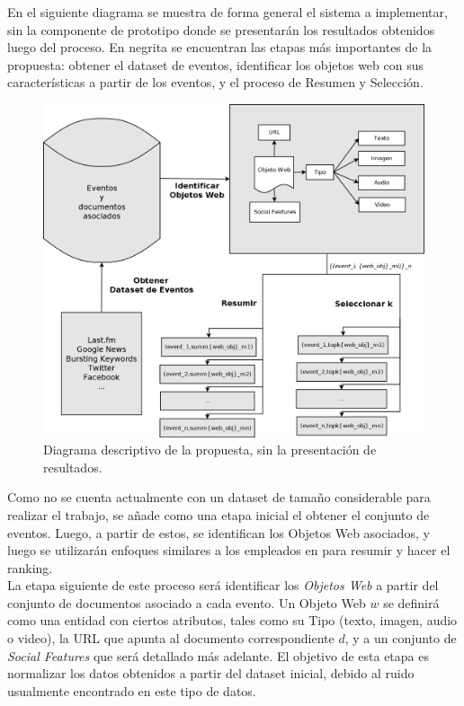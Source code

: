 \documentclass[11pt]{article}
\begin{document}
   En el siguiente diagrama se muestra de forma general el sistema a implementar, sin la componente de prototipo donde se presentarán los resultados obtenidos luego del proceso. En negrita se encuentran las etapas más importantes de la propuesta: obtener el dataset de eventos, identificar los objetos web con sus características a partir de los eventos, y el proceso de Resumen y Selección.\\

   \begin{figure}[htb]
\centering
\includegraphics[width=15cm]{./img/fw.png}
\caption{Diagrama descriptivo de la propuesta, sin la presentación de resultados.}
\end{figure}

   Como no se cuenta actualmente con un dataset de tamaño considerable para realizar el trabajo, se añade como una etapa inicial el obtener el conjunto de eventos. Luego, a partir de estos, se identifican los Objetos Web asociados, y luego se utilizarán enfoques similares a los empleados en \cite{events,clusterers} para resumir y hacer el ranking.\\

   La etapa siguiente de este proceso será identificar los \emph{Objetos Web} a partir del conjunto de documentos asociado a cada evento. Un Objeto Web $w$ se definirá como una entidad con ciertos atributos, tales como su Tipo (texto, imagen, audio o video), la URL que apunta al documento correspondiente $d$, y a un conjunto de \emph{Social Features} que será detallado más adelante. El objetivo de esta etapa es normalizar los datos obtenidos a partir del dataset inicial, debido al ruido usualmente encontrado en este tipo de datos.\\
\end{document}
